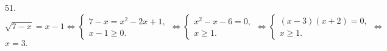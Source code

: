51. $\sqrt{7-x}=x-1\Leftrightarrow \begin{cases} 7-x=x^2-2x+1,\\ x-1\geqslant0.\end{cases}\Leftrightarrow \begin{cases} x^2-x-6=0,\\ x\geqslant1.\end{cases}
\Leftrightarrow \begin{cases} (x-3)(x+2)=0,\\ x\geqslant1.\end{cases}\Leftrightarrow$\\$x=3.$\\
